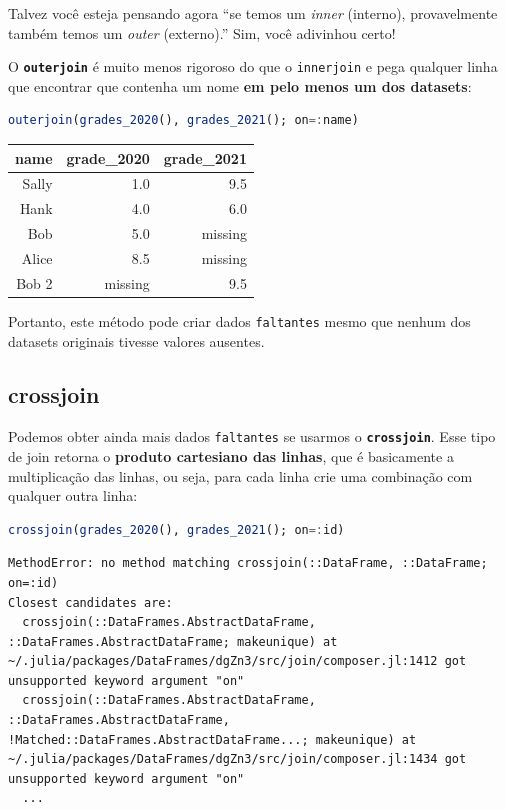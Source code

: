 \documentclass[
  notoc %
]{tufte-book}
\newcommand{\passthrough}[1]{#1}
\begin{document}
Talvez você esteja pensando agora ``se temos um \emph{inner} (interno),
provavelmente também temos um \emph{outer} (externo).'' Sim, você
adivinhou certo!

O \textbf{\passthrough{\lstinline!outerjoin!}} é muito menos rigoroso do
que o \passthrough{\lstinline!innerjoin!} e pega qualquer linha que
encontrar que contenha um nome \textbf{em pelo menos um dos datasets}:

\begin{lstlisting}[language=Julia]
outerjoin(grades_2020(), grades_2021(); on=:name)
\end{lstlisting}

\begin{longtable}[]{@{}rrr@{}}
\toprule
name & grade\_2020 & grade\_2021 \\
\midrule
\endhead
Sally & 1.0 & 9.5 \\
Hank & 4.0 & 6.0 \\
Bob & 5.0 & missing \\
Alice & 8.5 & missing \\
Bob 2 & missing & 9.5 \\
\bottomrule
\end{longtable}

Portanto, este método pode criar dados
\passthrough{\lstinline!faltantes!} mesmo que nenhum dos datasets
originais tivesse valores ausentes.

\hypertarget{sec:crossjoin}{%
\subsection{crossjoin}\label{sec:crossjoin}}

Podemos obter ainda mais dados \passthrough{\lstinline!faltantes!} se
usarmos o \textbf{\passthrough{\lstinline!crossjoin!}}. Esse tipo de
join retorna o \textbf{produto cartesiano das linhas}, que é basicamente
a multiplicação das linhas, ou seja, para cada linha crie uma combinação
com qualquer outra linha:

\begin{lstlisting}[language=Julia]
crossjoin(grades_2020(), grades_2021(); on=:id)
\end{lstlisting}

\begin{lstlisting}[language=Output]
MethodError: no method matching crossjoin(::DataFrame, ::DataFrame; on=:id)
Closest candidates are:
  crossjoin(::DataFrames.AbstractDataFrame, ::DataFrames.AbstractDataFrame; makeunique) at ~/.julia/packages/DataFrames/dgZn3/src/join/composer.jl:1412 got unsupported keyword argument "on"
  crossjoin(::DataFrames.AbstractDataFrame, ::DataFrames.AbstractDataFrame, !Matched::DataFrames.AbstractDataFrame...; makeunique) at ~/.julia/packages/DataFrames/dgZn3/src/join/composer.jl:1434 got unsupported keyword argument "on"
  ...
\end{lstlisting}
\end{document}
